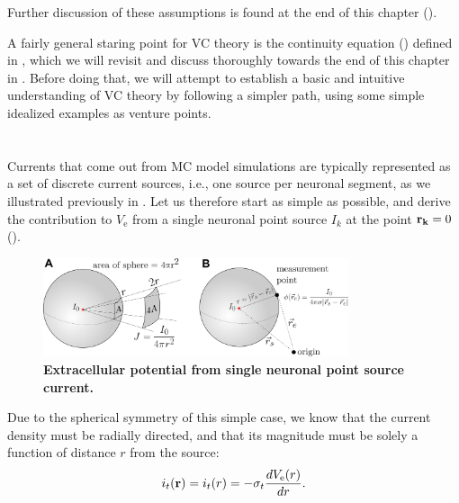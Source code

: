 Further discussion of these assumptions is found at the end of this chapter ().

A fairly general staring point for VC theory is the continuity equation () defined in , which we will revisit and discuss thoroughly towards the end of this chapter in . Before doing that, we will attempt to establish a basic and intuitive understanding of VC theory by following a simpler path, using some simple idealized examples as venture points. 


\section{}
\label{sec:VC:pointsource}
Currents that come out from MC model simulations are typically represented as a set of discrete current sources, i.e., one source per neuronal segment, as we illustrated previously in . Let us therefore start as simple as possible, and derive the contribution to $V_\mathrm{e}$ from a single neuronal point source $I_k$ at the point ${\bf r_k}=0$ ().

\begin{figure}[!ht]
\begin{center}
\includegraphics[width=0.8\textwidth]{Figures/VC/EP_from_pointsource_illustration.png}
\end{center}
\caption{\textbf{Extracellular potential from single neuronal point source current.} 
}
\label{fig:VC:pointsource}
\end{figure}
Due to the spherical symmetry of this simple case, we know that the current density must be radially directed, and that its magnitude must be solely a function of distance $r$ from the source:
\begin{equation}
i_t({\bf r}) = i_t(r) = -\sigma_t \frac{dV_\mathrm{e}(r)}{dr}.
\end{equation}

